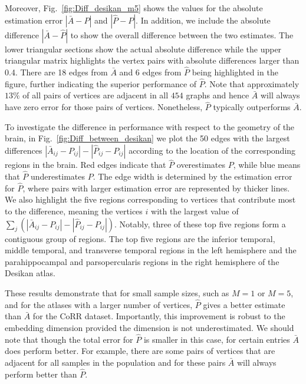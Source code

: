 \documentclass[10pt,letterpaper]{article}
\renewcommand{\hat}{\widehat}
\begin{document}
Moreover, Fig.~\ref{fig:Diff_desikan_m5} shows the values for the absolute estimation error $|\bar{A} - P|$ and $|\hat{P}-P|$. In addition, we include the absolute difference $|\bar{A} - \hat{P}|$ to show the overall difference between the two estimates. The lower triangular sections show the actual absolute difference while the upper triangular matrix highlights the vertex pairs with absolute differences larger than 0.4. 
There are 18 edges from $\bar{A}$ and 6 edges from $\hat{P}$ being highlighted in the figure, further indicating the superior performance of $\hat{P}$.
Note that approximately $13\%$ of all pairs of vertices are adjacent in all $454$ graphs and hence $\bar{A}$ will always have zero error for those pairs of vertices.
Nonetheless, $\hat{P}$ typically outperforms $\bar{A}$.

To investigate the difference in performance with respect to the geometry of the brain, 
in Fig.~\ref{fig:Diff_between_desikan} we plot the 50 edges with the largest differences $|\bar{A}_{ij} - P_{ij}| - |\hat{P}_{ij} - P_{ij}|$ according to the location of the corresponding regions in the brain. Red edges indicate that $\hat{P}$ overestimates $P$, while blue means that $\hat{P}$ underestimates $P$. The edge width is determined by the estimation error for $\hat{P}$, where pairs with larger estimation error are represented by thicker lines.
We also highlight the five regions corresponding to vertices that contribute most to the difference, meaning the vertices $i$ with the largest value of $\sum_j (|\bar{A}_{ij} - P_{ij}| - |\hat{P}_{ij} - P_{ij}|)$.
Notably, three of these top five regions form a contiguous group of regions.
The top five regions are the inferior temporal, middle temporal, and transverse temporal regions in the left hemisphere and the parahippocampal and parsopercularis regions in the right hemisphere of the Desikan atlas.

These results demonstrate that for small sample sizes, such as $M=1$ or $M=5$, and for the atlases with a larger number of vertices, $\hat{P}$ gives a better estimate than $\bar{A}$ for the CoRR dataset.
Importantly, this improvement is robust to the embedding dimension provided the dimension is not underestimated.
We should note that though the total error for $\hat{P}$ is smaller in this case, for certain entries $\bar{A}$ does perform better.
For example, there are some pairs of vertices that are adjacent for all samples in the population and for these pairs $\bar{A}$ will always perform better than $\hat{P}$. 
\end{document}

